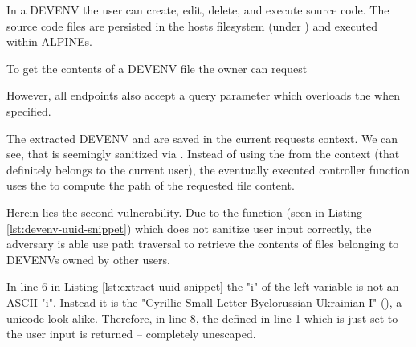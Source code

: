 \documentclass[10pt]{article}
\begin{document}
In a DEVENV the user can create, edit, delete, and execute source code. The source code files are persisted in the hosts filesystem (under ) and executed within ALPINEs.

To get the contents of a DEVENV file the owner can request
\begin{center}
\end{center}
However, all  endpoints also accept a query parameter  which overloads the  when specified.



The extracted DEVENV and  are saved in the current requests context. We can see, that  is seemingly sanitized via . Instead of using the  from the context (that definitely belongs to the current user), the eventually executed controller function  uses the  to compute the path of the requested file content.



Herein lies the second vulnerability. Due to the  function (seen in Listing \ref{lst:devenv-uuid-snippet}) which does not sanitize user input correctly, the adversary is able use path traversal to retrieve the contents of files belonging to DEVENVs owned by other users.



In line 6 in Listing \ref{lst:extract-uuid-snippet} the "i" of the left  variable is not an ASCII "i". Instead it is the "Cyrillic Small Letter Byelorussian-Ukrainian I" (), a unicode look-alike. Therefore, in line 8, the  defined in line 1 which is just set to the user input is returned -- completely unescaped.
\end{document}
